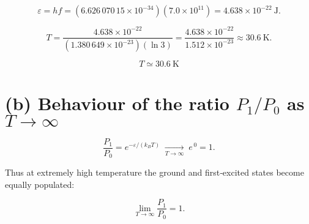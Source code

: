 \documentclass[12pt]{article}
\theoremstyle{definition} %
\theoremstyle{plain} %
\begin{document}
\[
\varepsilon = h f
            = (6.626\,070\,15\times10^{-34})
              (7.0\times10^{11})
            = 4.638\times10^{-22}\ \text{J}.
\]

\[
T = \frac{4.638\times10^{-22}}
         {(1.380\,649\times10^{-23})(\ln 3)}
  = \frac{4.638\times10^{-22}}
         {1.512\times10^{-23}}
  \approx 30.6\ \text{K}.
\]

\[
\boxed{T \simeq 30.6\ \text{K}}
\]

\section*{(b) Behaviour of the ratio $P_1/P_0$ as $T\to\infty$}

\[
\frac{P_1}{P_0} = e^{-\varepsilon/(k_B T)}
\;\xrightarrow[T\to\infty]{}\;
e^{\,0} = 1.
\]

Thus at extremely high temperature the ground and first‑excited states
become equally populated:

\[
\boxed{\displaystyle \lim_{T\to\infty}\frac{P_1}{P_0}=1 }.
\]
\end{document}
